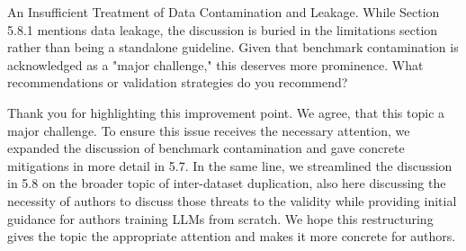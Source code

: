 \documentclass[12pt,english]{reviewresponse}
\begin{document}
\begin{revcomment}
An Insufficient Treatment of Data Contamination and Leakage. While Section 5.8.1 mentions data leakage, the discussion is buried in the limitations section rather than being a standalone guideline. Given that benchmark contamination is acknowledged as a "major challenge," this deserves more prominence. What recommendations or validation strategies do you recommend?
\end{revcomment}
\begin{revresponse}

Thank you for highlighting this improvement point. We agree, that this topic a major challenge. To ensure this issue receives the necessary attention, we expanded the discussion of benchmark contamination and gave concrete mitigations in more detail in 5.7. In the same line, we streamlined the discussion in 5.8 on the broader topic of inter-dataset duplication, also here discussing the necessity of authors to discuss those threats to the validity while providing initial guidance for authors training LLMs from scratch. We hope this restructuring gives the topic the appropriate attention and makes it more concrete for authors.
\end{revresponse}
\end{document}
